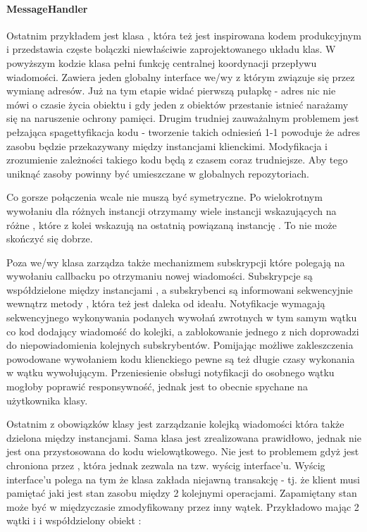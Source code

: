 \paragraph{MessageHandler}
Ostatnim przykładem jest klasa , która też jest inspirowana kodem produkcyjnym i przedstawia częste bolączki niewłaściwie zaprojektowanego układu klas.
W powyższym kodzie klasa  pełni funkcję centralnej koordynacji przepływu wiadomości. Zawiera jeden globalny interface we/wy  z którym związuje się przez wymianę adresów. Już na tym etapie widać pierwszą pułapkę - adres nic nie mówi o czasie życia obiektu i gdy jeden z obiektów przestanie istnieć narażamy się na naruszenie ochrony pamięci. Drugim trudniej zauważalnym problemem jest pełzająca spagettyfikacja kodu - tworzenie takich odniesień 1-1 powoduje że adres zasobu będzie przekazywany między instancjami klienckimi. Modyfikacja i zrozumienie zależności takiego kodu będą z czasem coraz trudniejsze. Aby tego uniknąć zasoby powinny być umieszczane w globalnych repozytoriach.

Co gorsze połączenia wcale nie muszą być symetryczne. Po wielokrotnym wywołaniu  dla różnych instancji  otrzymamy wiele instancji  wskazujących na różne , które z kolei wskazują na ostatnią powiązaną instancję . To nie może skończyć się dobrze.

Poza we/wy klasa  zarządza także mechanizmem subskrypcji które polegają na wywołaniu callbacku po otrzymaniu nowej wiadomości. Subskrypcje są współdzielone między instancjami , a subskrybenci są informowani sekwencyjnie wewnątrz metody , która też jest daleka od ideału. Notyfikacje wymagają sekwencyjnego wykonywania podanych wywołań zwrotnych w tym samym wątku co kod dodający wiadomość do kolejki, a zablokowanie jednego z nich doprowadzi do niepowiadomienia kolejnych subskrybentów. Pomijając możliwe zakleszczenia powodowane wywołaniem kodu klienckiego pewne są też długie czasy wykonania w wątku wywołującym. Przeniesienie obsługi notyfikacji do osobnego wątku mogłoby poprawić responsywność, jednak jest to obecnie spychane na użytkownika klasy.

Ostatnim z obowiązków klasy  jest zarządzanie kolejką wiadomości która także dzielona między instancjami. Sama klasa  jest zrealizowana prawidłowo, jednak nie jest ona przystosowana do kodu wielowątkowego. Nie jest to problemem gdyż jest chroniona przez , która jednak zezwala na tzw. wyścig interface'u. Wyścig interface'u polega na tym że klasa zakłada niejawną transakcję - tj. że klient musi pamiętać jaki jest stan zasobu między 2 kolejnymi operacjami. Zapamiętany stan może być w międzyczasie zmodyfikowany przez inny wątek. Przykładowo mając 2 wątki  i  i współdzielony obiekt :

